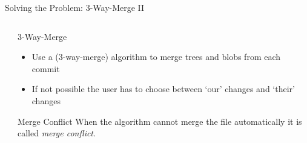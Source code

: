 \documentclass[xetex]{beamer}
\begin{document}
\begin{frame}[fragile]{Solving the Problem: 3-Way-Merge II}
\begin{columns}
\begin{column}{.55\linewidth}
    \end{column}
    \begin{column}{.45\linewidth}
      \begin{alertblock}{3-Way-Merge}
        \begin{itemize}
          \item Use a (3-way-merge) algorithm to merge trees and blobs from
            each commit

          \item If not possible the user has to choose between `our' changes
            and `their' changes
        \end{itemize}
      \end{alertblock}
      \begin{block}{Merge Conflict}
        When the algorithm cannot merge the file automatically it is called
        \emph{merge conflict}.
      \end{block}
    \end{column}
  \end{columns}
\end{frame}
\end{document}
